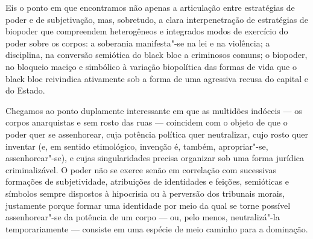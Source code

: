 Eis o ponto em que encontramos não apenas a articulação entre
estratégias de poder e de subjetivação, mas, sobretudo, a clara
interpenetração de estratégias de biopoder que compreendem heterogêneos
e integrados modos de exercício do poder sobre os corpos: a soberania
manifesta"-se na lei e na violência; a disciplina, na conversão semiótica
do black bloc a criminosos comuns; o biopoder, no bloqueio maciço e
simbólico à variação biopolítica das formas de vida que o black bloc
reivindica ativamente sob a forma de uma agressiva recusa do capital e
do Estado.

Chegamos ao ponto duplamente interessante em que as multidões indóceis
--- os corpos anarquistas e sem rosto das ruas --- coincidem com o objeto
de que o poder quer se assenhorear, cuja potência política quer
neutralizar, cujo rosto quer inventar (e, em sentido etimológico,
invenção é, também, apropriar"-se, assenhorear"-se), e cujas
singularidades precisa organizar sob uma forma jurídica criminalizável.
O poder não se exerce senão em correlação com sucessivas formações de
subjetividade, atribuições de identidades e feições, semióticas e
símbolos sempre dispostos à hipocrisia ou à perversão dos tribunais
morais, justamente porque formar uma identidade por meio da qual se
torne possível assenhorear"-se da potência de um corpo --- ou, pelo menos,
neutralizá"-la temporariamente --- consiste em uma espécie de meio caminho
para a dominação.

